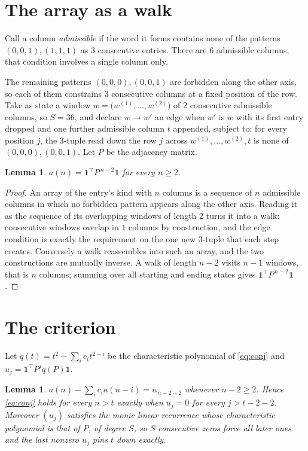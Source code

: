 \documentclass[11pt,a4paper]{article}
\theoremstyle{plain}
\newtheorem{lemma}[theorem]{Lemma}
\theoremstyle{definition}
\begin{document}
\section{The array as a walk}

Call a column \emph{admissible} if the word it forms contains none of the patterns
$(0,0,1), (1,1,1)$ as $3$ consecutive entries. There are $6$ admissible columns; that condition
involves a single column only.

The remaining patterns $(0,0,0), (0,0,1)$ are forbidden along the other axis, so each of them
constrains $3$ consecutive columns at a fixed position of the row. Take as state a
window $w=\bigl(w^{(1)},\dots,w^{(2)}\bigr)$ of $2$ consecutive admissible
columns, so $S=36$, and declare $w\to w'$ an edge when $w'$ is $w$ with its first entry
dropped and one further admissible column $t$ appended, subject to: for every position
$j$, the $3$-tuple read down the row $j$ across $w^{(1)},\dots,w^{(2)},t$
is none of $(0,0,0), (0,0,1)$. Let $P$ be the adjacency matrix.

\begin{lemma}\label{lem:walk}
$a(n)=\mathbf{1}^{\!\top}P^{\,n-2}\mathbf{1}$ for every $n\ge2$.
\end{lemma}

\begin{proof}
An array of the entry's kind with $n$ columns is a sequence of $n$ admissible columns in
which no forbidden pattern appears along the other axis. Reading it as the sequence of its
overlapping windows of length $2$ turns it into a walk: consecutive windows overlap in
$1$ columns by construction, and the edge condition is exactly the requirement on the one
new $3$-tuple that each step creates. Conversely a walk reassembles into such an array,
and the two constructions are mutually inverse. A walk of length $n-2$ visits $n-1$
windows, that is $n$ columns; summing over all starting and ending states gives
$\mathbf{1}^{\!\top}P^{\,n-2}\mathbf{1}$.
\end{proof}

\section{The criterion}

Let $q(t)=t^{2}-\sum_i c_i t^{2-i}$ be the characteristic polynomial of
\eqref{eq:conj} and $u_j=\mathbf{1}^{\!\top}P^{j}q(P)\mathbf{1}$.

\begin{lemma}\label{lem:crit}
$a(n)-\sum_i c_i a(n-i)=u_{\,n-2-2}$ whenever $n-2\ge2$. Hence
\eqref{eq:conj} holds for every $n>t$ exactly when $u_j=0$ for every
$j>t-2-2$. Moreover $(u_j)$ satisfies the monic linear recurrence whose
characteristic polynomial is that of $P$, of degree $S$, so $S$ consecutive zeros force all
later ones and the last nonzero $u_j$ pins $t$ down exactly.
\end{lemma}
\end{document}
